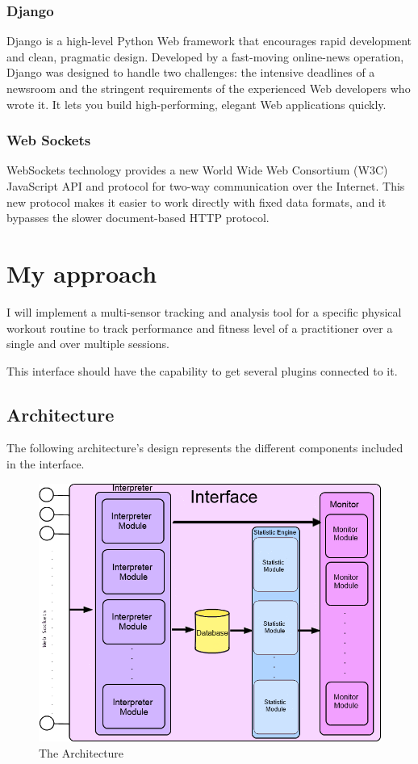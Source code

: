\documentclass[a4paper]{article}
\begin{document}
\subsubsection{Django}
Django is a high-level Python Web framework that encourages rapid development and clean, pragmatic design. Developed by a fast-moving online-news operation, Django was designed to handle two challenges: the intensive deadlines of a newsroom and the stringent requirements of the experienced Web developers who wrote it. It lets you build high-performing, elegant Web applications quickly.

\subsubsection{Web Sockets}
WebSockets technology provides a new World Wide Web Consortium (W3C) JavaScript API and protocol for two-way communication over the Internet. This new protocol makes it easier to work directly with fixed data formats, and it bypasses the slower document-based HTTP protocol.

\section{My approach}
I will implement a multi-sensor tracking and analysis tool for a specific physical workout routine to track performance and fitness level of a practitioner over a single and over multiple sessions.

This interface should have the capability to get several plugins connected to it.

\newpage

\subsection{Architecture}
The following architecture's design represents the different components included in the interface.

\begin{figure}[h!]
\centering
\includegraphics[scale=0.6]{Interface.png}
\caption{The Architecture}
\label{threadsVsSync}
\end{figure}
\end{document}
